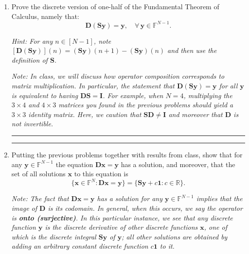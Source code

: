 \documentclass[12pt]{amsart}
\newcommand{\1}{\mathbbm{1}}
\newcounter{Theorem}
\numberwithin{equation}{section}
\numberwithin{Theorem}{section}
\theoremstyle{plain} %
\theoremstyle{definition}
\theoremstyle{remark}
\begin{document}
\begin{enumerate}[1.]
\bigskip
\hrule
\bigskip

\bigskip
\hrule
\bigskip

\item
Prove the discrete version of one-half of the Fundamental Theorem of Calculus, namely that:
\begin{equation*}
\mathbf{D}(\mathbf{S}\mathbf{y})=\mathbf{y},\quad\forall\,\mathbf{y}\in\mathbb{F}^{N-1}.
\end{equation*}

\textit{Hint: For any $n\in[N-1]$,
note $[\mathbf{D}(\mathbf{S}\mathbf{y})](n)=(\mathbf{S}\mathbf{y})(n+1)-(\mathbf{S}\mathbf{y})(n)$ and then use the definition of $\mathbf{S}$.}

\textit{Note: In class, we will discuss how operator composition corresponds to matrix multiplication.
In particular, the statement that $\mathbf{D}(\mathbf{S}\mathbf{y})=\mathbf{y}$ for all $\mathbf{y}$ is equivalent to having $\mathbf{D}\mathbf{S}=\mathbf{I}$.
For example, when $N=4$, multiplying the $3\times 4$ and $4\times 3$ matrices you found in the previous problems should yield a $3\times 3$ identity matrix.
Here, we caution that $\mathbf{S}\mathbf{D}\neq\mathbf{I}$ and moreover that $\mathbf{D}$ is not invertible.}

\bigskip
\hrule
\bigskip

\bigskip
\hrule
\bigskip

\item
Putting the previous problems together with results from class,
show that for any $\mathbf{y}\in\mathbb{F}^{N-1}$ the equation $\mathbf{D}\mathbf{x}=\mathbf{y}$ has a solution, and moreover, that the set of all solutions $\mathbf{x}$ to this equation is
\begin{equation*}
\{\mathbf{x}\in\mathbb{F}^N: \mathbf{D}\mathbf{x}=\mathbf{y}\}
=\{\mathbf{S}\mathbf{y}+c\mathbf{1}: c\in\mathbb{R}\}.
\end{equation*}

\textit{Note:
The fact that $\mathbf{D}\mathbf{x}=\mathbf{y}$ has a solution for any $\mathbf{y}\in\mathbb{F}^{N-1}$ implies that the image of $\mathbf{D}$ is its codomain.
In general, when this occurs, we say the operator is \textbf{onto (surjective)}.
In this particular instance, we see that any discrete function $\mathbf{y}$ is the discrete derivative of other discrete functions $\mathbf{x}$,
one of which is the discrete integral $\mathbf{S}\mathbf{y}$ of $\mathbf{y}$;
all other solutions are obtained by adding an arbitrary constant discrete function $c\mathbf{1}$ to it.}



\end{enumerate}
\end{document}
